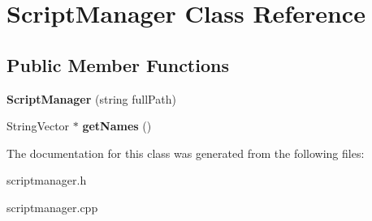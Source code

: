 \hypertarget{class_script_manager}{\section{\-Script\-Manager \-Class \-Reference}
\label{class_script_manager}
}
\subsection*{\-Public \-Member \-Functions}
\begin{DoxyCompactItemize}
\item 
\hypertarget{class_script_manager_a6b3d26553d13478e77651a355dd16481}{{\bfseries \-Script\-Manager} (string full\-Path)}\label{class_script_manager_a6b3d26553d13478e77651a355dd16481}

\item 
\hypertarget{class_script_manager_a3037f66acbbc88a250e9e9bfe284d1d7}{\-String\-Vector $\ast$ {\bfseries get\-Names} ()}\label{class_script_manager_a3037f66acbbc88a250e9e9bfe284d1d7}

\end{DoxyCompactItemize}


\-The documentation for this class was generated from the following files\-:\begin{DoxyCompactItemize}
\item 
scriptmanager.\-h\item 
scriptmanager.\-cpp\end{DoxyCompactItemize}
